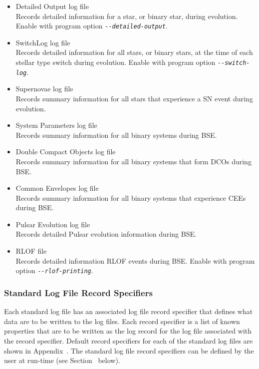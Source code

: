 \begin{itemize}
\itemsep0pt
\item{Detailed Output log file \\ Records detailed information for a star, or binary star, during evolution. Enable with program option \textit{\texttt{-{}-{detailed-output}}}.}
\item{SwitchLog log file \\ Records detailed information for all stars, or binary stars, at the time of each stellar type switch during evolution. Enable with program option \textit{\texttt{-{}-{switch-log}}}.}
\item{Supernovae log file \\ Records summary information for all stars that experience a SN event during evolution.}
\item{System Parameters log file \\ Records summary information for all binary systems during BSE.}
\item{Double Compact Objects log file \\ Records summary information for all binary systems that form DCOs during BSE.}
\item{Common Envelopes log file \\ Records summary information for all binary systems that experience CEEs during BSE.}
\item{Pulsar Evolution log file \\ Records detailed Pulsar evolution information during BSE.}
\item{RLOF file \\ Records detailed information RLOF events during BSE. Enable with program option \textit{\texttt{-{}-{rlof-printing}}}.}
\end{itemize}

\newpage
\subsubsection{Standard Log File Record Specifiers}\label{sec:StandardLogFileRecordSpecifiers}

Each standard log file has an associated log file record specifier that defines what data are to be written to the log files. Each record specifier is a list of known properties that are to be written as the log record for the log file associated with the record specifier. Default record specifiers for each of the standard log files are shown in Appendix~. The standard log file record specifiers can be defined by the user at run-time (see Section~ below).


